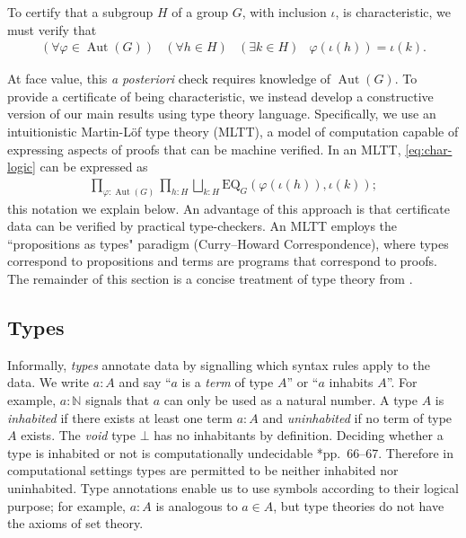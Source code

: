 \documentclass{amsart}
\numberwithin{lstfloat}{section}
\DeclareMathOperator{\Aut}{Aut}
\theoremstyle{definition}
\theoremstyle{remark}
\numberwithin{equation}{section}
\begin{document}
To certify that a subgroup $H$ of a group $G$, with inclusion
$\iota$, is characteristic, we must verify that 
\begin{equation}\label{eq:char-logic}
\begin{array}{llll}
   (\forall \varphi\in \Aut(G)) &(\forall h\in H) & (\exists k\in H)& \varphi(\iota(h))=\iota(k).
 \end{array}
\end{equation}

 
At face value, 
this \textit{a posteriori} check requires knowledge of $\Aut(G)$.
To provide a certificate of being characteristic, 
we instead develop a constructive version of our main results using 
type theory language.
Specifically, we use an 
intuitionistic Martin-L\"of type theory (MLTT), a model of
computation capable of expressing aspects of proofs that can be machine
verified. 
In an MLTT,
\eqref{eq:char-logic} can be expressed as
\begin{align*}
  \prod_{\varphi:\Aut(G)}\prod_{h:H}\bigsqcup_{k:H}\mathrm{EQ}_G\left(\varphi(\iota(h)), \iota(k)\right);
\end{align*}
this notation we explain below. An advantage of this approach is that
certificate data can be verified by practical  
type-checkers. 
An MLTT employs the ``propositions as types" paradigm 
(Curry--Howard Correspondence),
where types correspond to propositions and terms are programs that 
correspond to proofs. The remainder of this section is a concise treatment 
of type theory from
.

\subsection{Types}
\label{sec:types}
Informally, \emph{types} annotate data by signalling which syntax rules apply
to the data. We write $a:A$ and 
say ``$a$ is a \emph{term} of type $A$'' or ``$a$
inhabits $A$''.  
For example, $a: \mathbb{N}$
signals that $a$ can only be used as a natural number. 
A type $A$ is \emph{inhabited} if there exists at
least one term $a:A$ and \emph{uninhabited} if no term of type $A$ exists.  
The \emph{void} type $\bot$ has no inhabitants by definition.  
Deciding whether a
type is inhabited or not is computationally undecidable \cite{Hindley-Seldin}*{pp.~66--67}. Therefore in computational settings 
types are permitted to be neither inhabited nor uninhabited.
Type annotations enable us to use symbols according to their logical
purpose; for example, $a:A$ is analogous to $a\in A$,
but type theories do not have the axioms of set theory.
\end{document}
